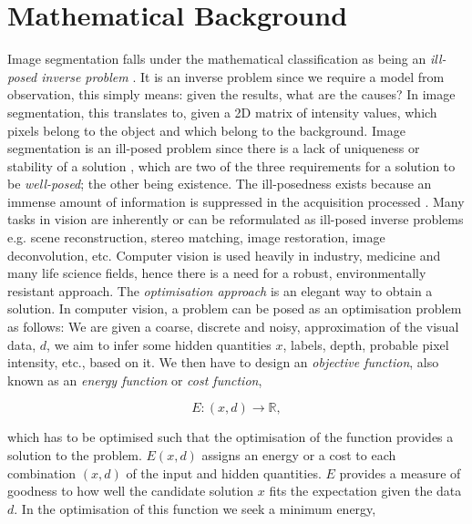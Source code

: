 
\chapter{Mathematical Background} %

\label{chap:Chapter3} %


Image segmentation falls under the mathematical classification as being an \textit{ill-posed inverse problem} \citep{Poggio1985,Terzopoulos1986}.
It is an inverse problem since we require a model from observation, this simply means: given the results, what are the causes?
In image segmentation, this translates to, given a 2D matrix of intensity values, which pixels belong to the object and which belong to the background.
Image segmentation is an ill-posed problem since there is a lack of uniqueness or stability of a solution \citep{Kabanikhin2008}, which are two of the three requirements for a solution to be \textit{well-posed}; the other being existence.
The ill-posedness exists because an immense amount of information is suppressed in the acquisition processed \citep{Tarantola2005,Bertero1998,Bertero2006}.
Many tasks in vision are inherently or can be reformulated as ill-posed inverse problems e.g. scene reconstruction, stereo matching, image restoration, image deconvolution, etc.
Computer vision is used heavily in industry, medicine and many life science fields, hence there is a need for a robust, environmentally resistant approach.
The \textit{optimisation approach} is an elegant way to obtain a solution.
In computer vision, a problem can be posed as an optimisation problem as follows: We are given a coarse, discrete and noisy, approximation of the visual data, $d$, we aim to infer some hidden quantities $x$, labels, depth, probable pixel intensity, etc., based on it.
We then have to design an \textit{objective function}, also known as an \textit{energy function} or \textit{cost function},

\begin{equation*}
	E:(x,d) \rightarrow \mathbb{R},
\end{equation*}

which has to be optimised such that the optimisation of the function provides a solution to the problem.
$E(x,d)$ assigns an energy or a cost to each combination $(x,d)$ of the input and hidden quantities.
$E$ provides a measure of goodness to how well the candidate solution $x$ fits the expectation given the data $d$.
In the optimisation of this function we seek a minimum energy,

